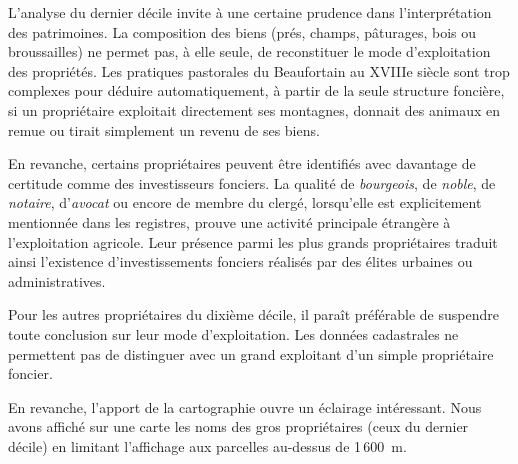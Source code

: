 \documentclass[12pt,a4paper]{report}
\begin{document}
	L'analyse du dernier décile invite à une certaine prudence dans l'interprétation des patrimoines. La composition des biens (prés, champs, pâturages, bois ou broussailles) ne permet pas, à elle seule, de reconstituer le mode d'exploitation des propriétés. Les pratiques pastorales du Beaufortain au XVIIIe siècle sont trop complexes pour déduire automatiquement, à partir de la seule structure foncière, si un propriétaire exploitait directement ses montagnes, donnait des animaux en remue ou tirait simplement un revenu de ses biens. 
	
	En revanche, certains propriétaires peuvent être identifiés avec davantage de certitude comme des investisseurs fonciers. La qualité de \textit{bourgeois}, de \textit{noble}, de \textit{notaire}, d'\textit{avocat} ou encore de membre du clergé, lorsqu'elle est explicitement mentionnée dans les registres, prouve une activité principale étrangère à l'exploitation agricole. Leur présence parmi les plus grands propriétaires traduit ainsi l'existence d'investissements fonciers réalisés par des élites urbaines ou administratives.
	
	Pour les autres propriétaires du dixième décile,  il paraît préférable de suspendre toute conclusion sur leur mode d'exploitation. Les données cadastrales ne permettent pas de distinguer avec un grand exploitant d'un simple propriétaire foncier.
	
	En revanche, l'apport de la cartographie ouvre un éclairage intéressant. Nous avons affiché sur une carte les noms des  gros propriétaires (ceux du dernier décile) en limitant l'affichage aux parcelles au-dessus de  1\,600~m. 
	
\end{document}

